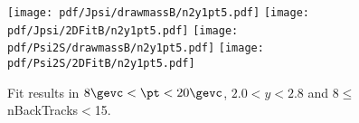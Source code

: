 \begin{figure}[H]
\begin{center}
\texttt{[image: pdf/Jpsi/drawmassB/n2y1pt5.pdf]}
\texttt{[image: pdf/Jpsi/2DFitB/n2y1pt5.pdf]}
\vspace*{-0.5cm}
\texttt{[image: pdf/Psi2S/drawmassB/n2y1pt5.pdf]}
\texttt{[image: pdf/Psi2S/2DFitB/n2y1pt5.pdf]}
\vspace*{-0.5cm}
\end{center}
\caption{Fit results in $8\gevc<\pt<20\gevc$, $2.0<y<2.8$ and 8$\leq$nBackTracks$<$15.}
\label{Fitn2y1pt5}
\end{figure}

